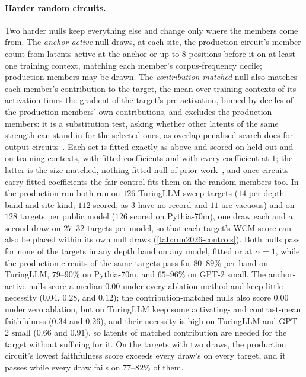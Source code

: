 \documentclass[10pt]{article}
\begin{document}
\paragraph{Harder random circuits.}
Two harder nulls keep everything else and change only where the members come from.
The \emph{anchor-active} null draws, at each site, the production circuit's member count from latents active at the anchor or up to $8$ positions before it on at least one training context, matching each member's corpus-frequency decile; production members may be drawn.
The \emph{contribution-matched} null also matches each member's contribution to the target, the mean over training contexts of its activation times the gradient of the target's pre-activation, binned by deciles of the production members' own contributions, and excludes the production members: it is a substitution test, asking whether other latents of the same strength can stand in for the selected ones, as overlap-penalised search does for output circuits~\citep{chen2026rome}.
Each set is fitted exactly as above and scored on held-out and on training contexts, with fitted coefficients and with every coefficient at $1$; the latter is the size-matched, nothing-fitted null of prior work~\citep{shi2024hypothesis, seth2026circuitkit}, and once circuits carry fitted coefficients the fair control fits them on the random members too.
In the production run both run on $126$ TuringLLM sweep targets ($14$ per depth band and site kind; $112$ scored, as $3$ have no record and $11$ are vacuous) and on $128$ targets per public model ($126$ scored on Pythia-70m), one draw each and a second draw on $27$--$32$ targets per model, so that each target's WCM score can also be placed within its own null draws (\cref{tab:run2026-controls}).
Both nulls pass for none of the targets in any depth band on any model, fitted or at $\alpha = 1$, while the production circuits of the same targets pass for $80$--$89\%$ per band on TuringLLM, $79$--$90\%$ on Pythia-70m, and $65$--$96\%$ on GPT-2 small.
The anchor-active nulls score a median $0.00$ under every ablation method and keep little necessity ($0.04$, $0.28$, and $0.12$); the contribution-matched nulls also score $0.00$ under zero ablation, but on TuringLLM keep some activating- and contrast-mean faithfulness ($0.34$ and $0.26$), and their necessity is high on TuringLLM and GPT-2 small ($0.66$ and $0.91$), so latents of matched contribution are needed for the target without sufficing for it.
On the targets with two draws, the production circuit's lowest faithfulness score exceeds every draw's on every target, and it passes while every draw fails on $77$--$82\%$ of them.
\end{document}
